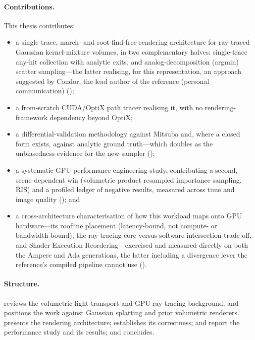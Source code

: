 \newpage
\paragraph{Contributions.} This thesis contributes:
\begin{itemize}
  \item a single-trace, march- and root-find-free rendering architecture for ray-traced Gaussian
  kernel-mixture volumes, in two complementary halves: single-trace any-hit collection with analytic
  exits, and analog-decomposition (argmin) scatter sampling---the latter realising, for this
  representation, an approach suggested by Condor, the lead author of the reference (personal
  communication) ();
  \item a from-scratch CUDA/OptiX path tracer realising it, with no rendering-framework dependency
  beyond OptiX;
  \item a differential-validation methodology against Mitsuba and, where a closed form exists, against
  analytic ground truth---which doubles as the unbiasedness evidence for the new sampler
  ();
  \item a systematic GPU performance-engineering study, contributing a second, scene-dependent win
  (volumetric product resampled importance sampling, RIS) and a profiled ledger of negative results,
  measured across time and image quality (); and
  \item a cross-architecture characterisation of how this workload maps onto GPU hardware---its roofline
  placement (latency-bound, not compute- or bandwidth-bound), the ray-tracing-core versus
  software-intersection trade-off, and Shader Execution Reordering---exercised and measured directly on
  both the Ampere and Ada generations, the latter including a divergence lever the reference's compiled
  pipeline cannot use ().
\end{itemize}

\paragraph{Structure.}  reviews the volumetric light-transport and GPU ray-tracing
background, and  positions the work against Gaussian splatting and prior
volumetric renderers.  presents the rendering architecture; 
establishes its correctness;  and  report the performance study
and its results; and  concludes.


